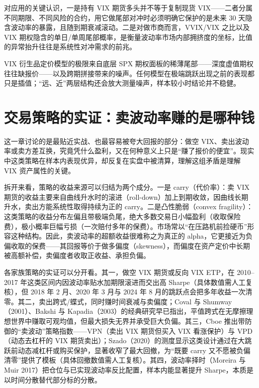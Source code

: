 \documentclass[11pt,a4paper]{ctexart}
\begin{document}
对应用的关键认识，一是持有 VIX 期货多头并不等于复制现货 VIX——二者分属不同期限、不同风险的合约，用它做尾部对冲时必须明确它保护的是未来 30 天隐含波动率的暴露，且随到期衰减滚动。二是对做市商而言，VVIX/VIX 之比以及 VIX 期权隐含的单日/单周尾部概率，是衡量波动率市场内部拥挤度的坐标，比值的异常抬升往往是系统性对冲需求的前兆。

VIX 衍生品定价模型的极限来自底层 SPX 期权面板的稀薄尾部——深度虚值期权往往缺报价——以及跨期拼接带来的噪声。任何模型在极端跳跃出现之前的表现都只是插值；“远、近”两层结构还会放大测量噪声，样本较小时结论并不稳健。

\section{交易策略的实证：卖波动率赚的是哪种钱}

这一章讨论的是最贴近实战、也最容易被夸大回报的部分：做空 VIX、卖出波动率或卖方差互换，究竟凭什么盈利，又在何种意义上只是“赚了报价的便宜”。现实中这类策略在样本内表现优异，却反复在实盘中被清算，理解这组矛盾是理解 VIX 资产属性的关键。

拆开来看，策略的收益来源可以归结为两个成分。一是 carry（代价率）：卖 VIX 期货的收益主要来自曲线升水时的滚进（roll-down）加上到期收敛，因曲线长期升水，卖出方能系统性取得持续为正的 carry。二是凸性脆弱（convex fragility）：这类策略的收益分布左偏且带极端负尾，绝大多数交易日小幅盈利（收取保险费），极小概率巨幅亏损（一次赔付多年的保费）。市场常以“在压路机前捡硬币”形容这种结构。因此，卖波动率的超额收益很难称之为真正的 alpha，它更接近为负偏收取的保费——其回报等价于做多偏度（skewness），而偏度在资产定价中长期被高额补偿，卖偏度者收取正收益、承担负偏。

各家族策略的实证可以分开看。其一，做空 VIX 期货或反向 VIX ETP，在 2010–2017 年这类区间内因波动率贴水加期限滚进而交出高 Sharpe（具体数值需人工复核），但 2018 年 2 月、2020 年 3 月与 2024 年 8 月的跳跃点会把多年收益一次清零。其二，卖出跨式/蝶式，同时赚时间衰减与卖偏度；Coval 与 Shumway（2001）、Bakshi 与 Kapadia（2003）的经典研究早已指出，平值跨式在无摩擦理想世界中赚取可观均值，但最大损失无界并承受巨大负偏。其三，Cboe 推出带防御的“卖波动”策略指数——VPN（卖出 VIX 期货但买入 VIX 看涨保护）与 VPD（动态去杠杆的 VIX 期货卖出）；Szado（2020）的测度显示这类设计通过在大跳跃前动态减杠杆或购买保护，显著收窄了最大回撤，为“既要 carry 又不愿被负偏清零”提供了模板（具体回撤数值需人工复核）。其四，波动率择时（Moreira 与 Muir 2017）把仓位与已实现波动率反比配置，样本内能显著提升 Sharpe，本质是以时间分散替代部分标的分散。
\end{document}
